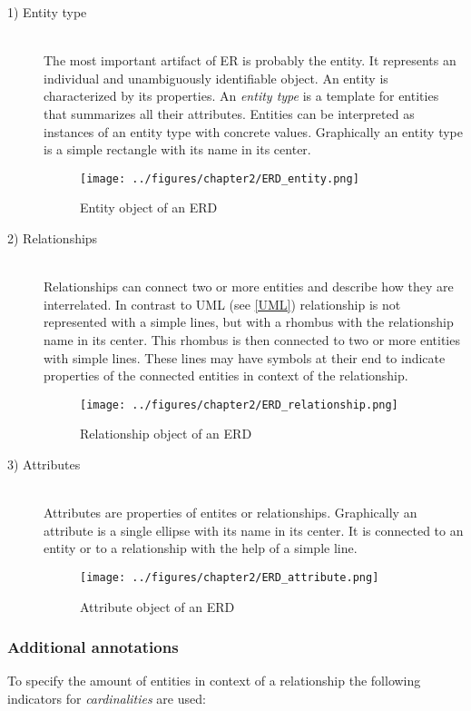 \documentclass[twoside, openright, 12pt]{book}
\begin{document}
\begin{description}
\item[1) Entity type]\hfill \\
The most important artifact of ER is probably the entity.
It represents an individual and unambiguously identifiable object.
An entity is characterized by its properties.
An \textit{entity type} is a template for entities that summarizes all their attributes.
Entities can be interpreted as instances of an entity type with concrete values.
Graphically an entity type is a simple rectangle with its name in its center.

\begin{figure}[htb]
	\centering
	\texttt{[image: ../figures/chapter2/ERD\_entity.png]}
	\caption{Entity object of an ERD}
	\label{fig:ERD_entity}
\end{figure}

\item[2) Relationships]\hfill \\
Relationships can connect two or more entities and describe how they are interrelated.
In contrast to UML (see \ref{UML}) relationship is not represented with a simple lines, but with a rhombus with the relationship name in its center.
This rhombus is then connected to two or more entities with simple lines.
These lines may have symbols at their end to indicate properties of the connected entities in context of the relationship.

\begin{figure}[htb]
	\centering
	\texttt{[image: ../figures/chapter2/ERD\_relationship.png]}
	\caption{Relationship object of an ERD}
	\label{fig:ERD_relationship}
\end{figure}

\item[3) Attributes]\hfill \\
Attributes are properties of entites or relationships.
Graphically an attribute is a single ellipse with its name in its center.
It is connected to an entity or to a relationship with the help of a simple line.

\begin{figure}[htb]
	\centering
	\texttt{[image: ../figures/chapter2/ERD\_attribute.png]}
	\caption{Attribute object of an ERD}
	\label{fig:ERD_}
\end{figure}
\end{description}

\subsubsection{Additional annotations}
\label{ER_additional_annotations}
To specify the amount of entities in context of a relationship the following indicators for \textit{cardinalities} are used:
\end{document}
